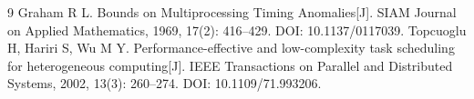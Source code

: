 \documentclass[UTF8,a4paper,zihao=-4]{ctexart}
\numberwithin{equation}{section}
\numberwithin{figure}{section}
\numberwithin{table}{section}
\begin{document}
\setcounter{section}{5}

\clearpage

\clearpage

\begin{thebibliography}{9}
 Graham R L. Bounds on Multiprocessing Timing Anomalies[J]. SIAM Journal on Applied Mathematics, 1969, 17(2): 416--429. DOI: 10.1137/0117039.
 Topcuoglu H, Hariri S, Wu M Y. Performance-effective and low-complexity task scheduling for heterogeneous computing[J]. IEEE Transactions on Parallel and Distributed Systems, 2002, 13(3): 260--274. DOI: 10.1109/71.993206.
\end{thebibliography}
\end{document}
